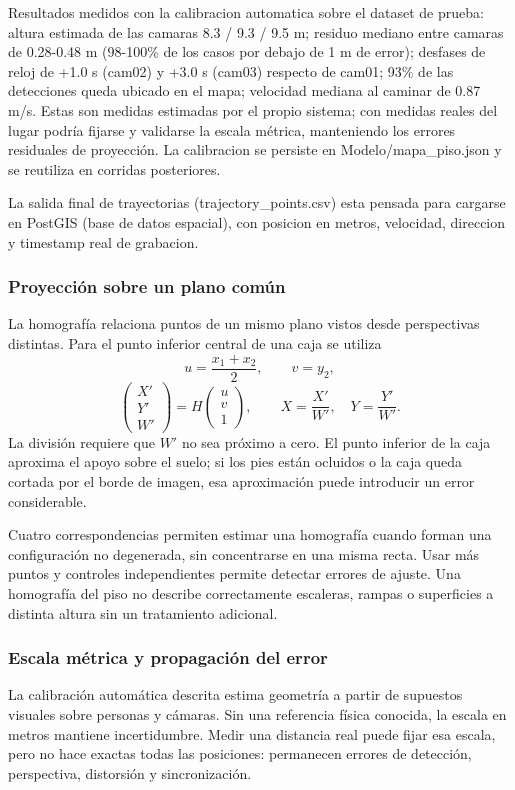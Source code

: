 \documentclass[12pt,letterpaper]{article}
\begin{document}
Resultados medidos con la calibracion automatica sobre el dataset de prueba: altura estimada de las camaras 8.3 / 9.3 / 9.5 m; residuo mediano entre camaras de 0.28-0.48 m (98-100\% de los casos por debajo de 1 m de error); desfases de reloj de +1.0 s (cam02) y +3.0 s (cam03) respecto de cam01; 93\% de las detecciones queda ubicado en el mapa; velocidad mediana al caminar de 0.87 m/s. Estas son medidas estimadas por el propio sistema; con medidas reales del lugar podría fijarse y validarse la escala métrica, manteniendo los errores residuales de proyección. La calibracion se persiste en Modelo/mapa\_piso.json y se reutiliza en corridas posteriores.


La salida final de trayectorias (trajectory\_points.csv) esta pensada para cargarse en PostGIS (base de datos espacial), con posicion en metros, velocidad, direccion y timestamp real de grabacion.


\subsubsection{Proyección sobre un plano común}
La homografía relaciona puntos de un mismo plano vistos desde perspectivas distintas. Para el punto inferior central de una caja se utiliza
\[
 u=\frac{x_1+x_2}{2},\qquad v=y_2,
\]
\[
 \left(\begin{array}{c}X'\\Y'\\W'\end{array}\right)
 =H\left(\begin{array}{c}u\\v\\1\end{array}\right),
 \qquad X=\frac{X'}{W'},\quad Y=\frac{Y'}{W'}.
\]
La división requiere que $W'$ no sea próximo a cero. El punto inferior de la caja aproxima el apoyo sobre el suelo; si los pies están ocluidos o la caja queda cortada por el borde de imagen, esa aproximación puede introducir un error considerable.

Cuatro correspondencias permiten estimar una homografía cuando forman una configuración no degenerada, sin concentrarse en una misma recta. Usar más puntos y controles independientes permite detectar errores de ajuste. Una homografía del piso no describe correctamente escaleras, rampas o superficies a distinta altura sin un tratamiento adicional.

\subsubsection{Escala métrica y propagación del error}
La calibración automática descrita estima geometría a partir de supuestos visuales sobre personas y cámaras. Sin una referencia física conocida, la escala en metros mantiene incertidumbre. Medir una distancia real puede fijar esa escala, pero no hace exactas todas las posiciones: permanecen errores de detección, perspectiva, distorsión y sincronización.
\end{document}
